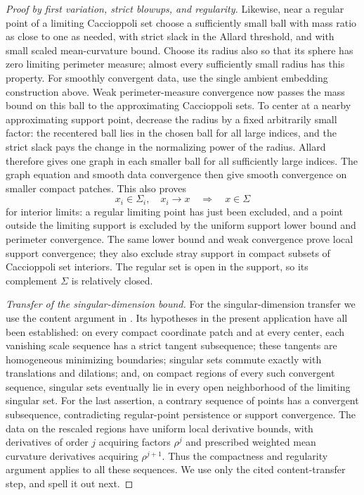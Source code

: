 \begin{proof}[Proof by first variation, strict blowups, and regularity]
Likewise, near a regular point of a limiting Caccioppoli set choose a sufficiently
small ball with mass ratio as close to one as needed, with strict slack
in the Allard threshold, and with small scaled mean-curvature bound.
Choose its radius also so that its sphere has zero limiting perimeter
measure; almost every sufficiently small radius has this property.
For smoothly convergent data, use the single ambient embedding
construction above.  Weak perimeter-measure convergence now passes the
mass bound on this ball to the approximating Caccioppoli sets.  To center at a
nearby approximating support point, decrease the radius by a fixed
arbitrarily small factor: the recentered ball lies in the chosen ball
for all large indices, and the strict slack pays the change in the
normalizing power of the radius.  Allard therefore gives one graph in
each smaller ball for all sufficiently large indices.  The graph equation and smooth data convergence then give
smooth convergence on smaller compact patches.  This also proves
\[
 x_i\in\Sigma_i,\quad x_i\longrightarrow x
                    \quad\Longrightarrow\quad x\in\Sigma
\]
for interior limits: a regular limiting point has just been excluded,
and a point outside the limiting support is excluded by the uniform
support lower bound and perimeter convergence.  The same lower bound
and weak convergence prove local support convergence; they also exclude
stray support in compact subsets of Caccioppoli set interiors.  The regular set
is open in the support, so its complement $\Sigma$ is relatively closed.

\emph{Transfer of the singular-dimension bound.}
For the singular-dimension transfer we use the content argument in
\citet[Chapter~1, Theorem~3.26(2), and Appendix~A, proof of Theorem~A.4,
step~(1)]{simonGMT}.
Its hypotheses in the present application have all been established:
on every compact coordinate patch and at every center, each vanishing
scale sequence has a strict tangent subsequence; these tangents are
homogeneous minimizing boundaries; singular sets commute exactly with
translations and dilations; and, on compact regions of every such
convergent sequence, singular sets eventually lie in every open
neighborhood of the limiting singular set.  For the last assertion,
a contrary sequence of points has a convergent subsequence, contradicting
regular-point persistence or support convergence.  The data on the
rescaled regions have uniform local derivative bounds, with derivatives
of order $j$ acquiring factors $\rho^j$ and prescribed weighted mean curvature derivatives acquiring
$\rho^{j+1}$.  Thus the compactness and regularity argument applies to
all these sequences.  We use only the cited content-transfer step, and
spell it out next.


\end{proof}
